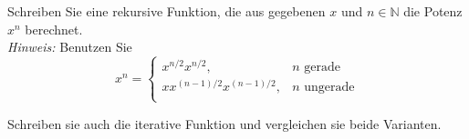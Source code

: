 \begin{aufg}[0]
Schreiben Sie eine rekursive Funktion, die aus gegebenen $x$ und $n \in
\mathbb{N}$ die Potenz $x^n$ berechnet. \\
{\it Hinweis:} Benutzen Sie 
\[ x^n = \left \{ \begin{array}{ll} 
x^{n/2} x^{n/2}, & n \mbox{ gerade} \\
x x^{(n-1)/2} x^{(n-1)/2}, &  n \mbox{ ungerade}\\
\end{array} \right.  \]
\end{aufg}
Schreiben sie auch die iterative Funktion und vergleichen sie beide Varianten.
